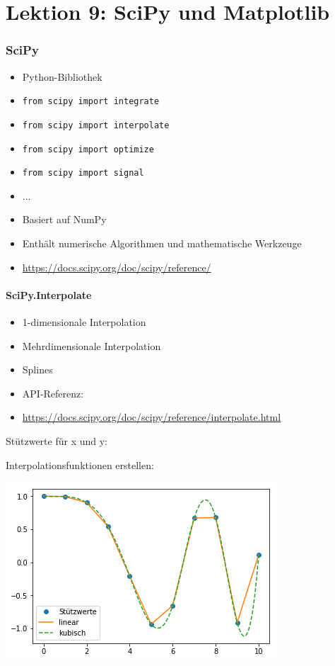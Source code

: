 \part*{Lektion 9: SciPy und Matplotlib}
\section{SciPy}
\begin{itemize}
	\item Python-Bibliothek
	\item[\-] \texttt{from scipy import integrate}
	\item[\-] \texttt{from scipy import interpolate}
	\item[\-] \texttt{from scipy import optimize}
	\item[\-] \texttt{from scipy import signal}
	\item[\-] ...
	\item Basiert auf NumPy
	\item Enthält numerische Algorithmen und mathematische Werkzeuge\\
	\item \url{https://docs.scipy.org/doc/scipy/reference/}
\end{itemize}

\subsection{SciPy.Interpolate}
\begin{itemize}
	\item 1-dimensionale Interpolation
	\item Mehrdimensionale Interpolation
	\item Splines
	\item API-Referenz:
	\item[\-] \url{https://docs.scipy.org/doc/scipy/reference/interpolate.html}
\end{itemize}

Stützwerte für x und y:

Interpolationsfunktionen erstellen:

\includegraphics[width=0.4\linewidth]{images/v9_interpolate1}

